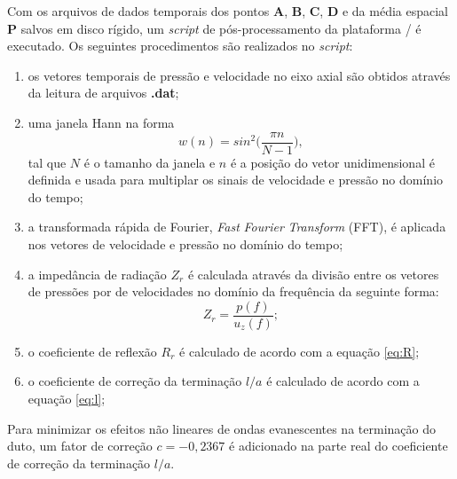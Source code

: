 Com os arquivos de dados temporais dos pontos $\textbf{A}$, $\textbf{B}$, $\textbf{C}$, $\textbf{D}$ e da média espacial $\textbf{P}$ salvos em disco rígido, um \textit{script} de pós-processamento da plataforma / é executado. Os seguintes procedimentos são realizados no \textit{script}:

\begin{enumerate}
  \item os vetores temporais de pressão e velocidade no eixo axial são obtidos através da leitura de arquivos \textbf{.dat};
  \item uma janela Hann na forma
  \begin{equation}
    w(n) = sin^{2}\bigg(\frac{\pi n}{N - 1} \bigg),  
  \end{equation}
  tal que $N$ é o tamanho da janela e $n$ é a posição do vetor unidimensional é definida e usada para multiplar os sinais de velocidade e pressão no domínio do tempo;

  \item a transformada rápida de Fourier, \textit{Fast} \textit{Fourier} \textit{Transform} (FFT), é aplicada nos vetores de velocidade e pressão no domínio do tempo;

  \item a impedância de radiação $Z_{r}$ é calculada através da divisão entre os vetores de pressões por de velocidades no domínio da frequência da seguinte forma:
  \begin{equation}
    Z_{r} = \frac{p(f)}{u_{z}(f)};
  \end{equation}

  \item o coeficiente de reflexão $R_{r}$ é calculado de acordo com a equação \ref{eq:R};

  \item o coeficiente de correção da terminação $l/a$ é calculado de acordo com a equação \ref{eq:l};

 \end{enumerate}

 Para minimizar os efeitos não lineares de ondas evanescentes na terminação do duto, um fator de correção $c = - 0,2367$ é adicionado na parte real do coeficiente de correção da terminação $l/a$.    